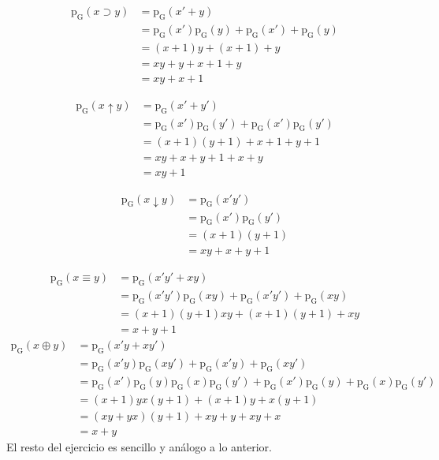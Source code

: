 \begin{solution}
  \begin{align*}
    \operatorname{p_{G}}(x\supset y)&=\operatorname{p_{G}}(x'+y)\\
         &=\operatorname{p_{G}}(x')\operatorname{p_{G}}(y)
           +\operatorname{p_{G}}(x')
           +\operatorname{p_{G}}(y)\\
          &=(x+1)y+(x+1)+y\\
          &=xy+y+x+1+y\\
          &=xy+x+1
  \end{align*}
  
  \begin{align*}
    \operatorname{p_{G}}(x\uparrow y)&=\operatorname{p_{G}}(x'+y')\\
    &=\operatorname{p_{G}}(x')\operatorname{p_{G}}(y')
    +\operatorname{p_{G}}(x')
      \operatorname{p_{G}}(y')\\
    &=(x+1)(y+1)+x+1+y+1\\
    &=xy+x+y+1+x+y\\
    &=xy+1
  \end{align*}

  \begin{align*}
    \operatorname{p_{G}}(x\downarrow y)&=\operatorname{p_{G}}(x'y')\\
           &=\operatorname{p_{G}}(x')\operatorname{p_{G}}(y')\\
           &=(x+1)(y+1)\\
           &=xy+x+y+1
  \end{align*}

  \begin{align*}
    \operatorname{p_{G}}(x\equiv y)&=\operatorname{p_{G}}(x'y'+xy)\\
       &=\operatorname{p_{G}}(x'y')\operatorname{p_{G}}(xy)+\operatorname{p_{G}}(x'y')
        +\operatorname{p_{G}}(xy)\\
       &=(x+1)(y+1)xy+(x+1)(y+1)+xy\\
       &=x+y+1
  \end{align*}
  \begin{align*}
    \operatorname{p_{G}}(x\oplus y)&=\operatorname{p_{G}}(x'y+xy')\\
       &=\operatorname{p_{G}}(x'y)\operatorname{p_{G}}(xy')
        +\operatorname{p_{G}}(x'y)
        +\operatorname{p_{G}}(xy')\\
       &=\operatorname{p_{G}}(x')\operatorname{p_{G}}(y)\operatorname{p_{G}}(x)\operatorname{p_{G}}(y')
        +\operatorname{p_{G}}(x')\operatorname{p_{G}}(y)
        +\operatorname{p_{G}}(x)\operatorname{p_{G}}(y')\\
       &=(x+1)yx(y+1)+(x+1)y+x(y+1)\\
       &=(xy+yx)(y+1)+xy+y+xy+x\\
       &=x+y
  \end{align*}
  El resto del ejercicio es sencillo y análogo a lo anterior.
\end{solution}

